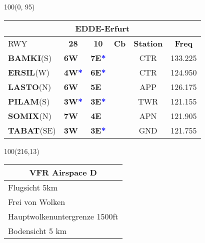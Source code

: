 \documentclass[10pt,landscape,a4paper]{article}
\begin{document}
\begin{textblock}{100}(0, 95)
\begin{table}[]
\begin{tabular}{|llllll}
\multicolumn{6}{c}{\textbf{EDDE-Erfurt}} \\ \hline
\multicolumn{1}{|l|}{RWY} 						& \multicolumn{1}{c|}{\textbf{28}} 				& \multicolumn{1}{c|}{\textbf{10}}  				& \multicolumn{1}{c|}{\textbf{Cb}} 						& \multicolumn{1}{c|}{\textbf{Station}} 	& \multicolumn{1}{c|}{\textbf{Freq}}	\\ \hline
\multicolumn{1}{|l|}{\textbf{BAMKI}(S)}				& \multicolumn{1}{l|}{\textbf{6W} }				& \multicolumn{1}{l|}{\textbf{7E\textcolor{blue}{*}}}	& \multicolumn{1}{c|}{\multirow{6}{*}{\rotatebox{90}{5000ft}}}		& \multicolumn{1}{c|}{CTR}			& \multicolumn{1}{c|}{133.225}	\\ \cline{1-3}
\multicolumn{1}{|l|}{\textbf{ERSIL}(W)}				& \multicolumn{1}{l|}{\textbf{4W\textcolor{blue}{*}}}	& \multicolumn{1}{l|}{\textbf{6E\textcolor{blue}{*}}}	& \multicolumn{1}{c|}{}  								& \multicolumn{1}{c|}{CTR}			& \multicolumn{1}{c|}{124.950}	\\ \cline{1-3}

\multicolumn{1}{|l|}{\textbf{LASTO}(N)} 				& \multicolumn{1}{l|}{\textbf{6W}} 				& \multicolumn{1}{l|}{\textbf{5E}}				& \multicolumn{1}{c|}{} 								& \multicolumn{1}{c|}{APP}			& \multicolumn{1}{c|}{126.175}	\\ \cline{1-3}
\multicolumn{1}{|l|}{\textbf{PILAM}(S)}				& \multicolumn{1}{l|}{\textbf{3W\textcolor{blue}{*}}}	& \multicolumn{1}{l|}{\textbf{3E\textcolor{blue}{*}}}	& \multicolumn{1}{c|}{} 								& \multicolumn{1}{c|}{TWR} 			& \multicolumn{1}{c|}{121.155}		\\ \cline{1-3} 

\multicolumn{1}{|l|}{\textbf{SOMIX}(N)} 				& \multicolumn{1}{l|}{\textbf{7W}}				& \multicolumn{1}{l|}{\textbf{4E}}				& \multicolumn{1}{c|}{}								& \multicolumn{1}{c|}{APN}			& \multicolumn{1}{c|}{121.905} 	\\\cline{1-3}
\multicolumn{1}{|l|}{\textbf{TABAT}(SE)} 				& \multicolumn{1}{l|}{\textbf{3W}} 				& \multicolumn{1}{l|}{\textbf{3E\textcolor{blue}{*}}}	& \multicolumn{1}{c|}{}  								& \multicolumn{1}{c|}{GND}			& \multicolumn{1}{c|}{121.755} \\ \hline
\end{tabular}
\end{table}
\end{textblock}


\begin{textblock}{100}(216,13)
\begin{table}[]
\begin{tabular}{|l|}
\multicolumn{1}{c}{\textbf{VFR Airspace D}} \\ \hline
 Flugsicht 5km   \\ \hline
Frei von Wolken   \\ \hline
Hauptwolkenuntergrenze 1500ft \\ \hline
Bodensicht 5 km \\ \hline
\end{tabular}
\end{table}
\end{textblock}
\end{document}
